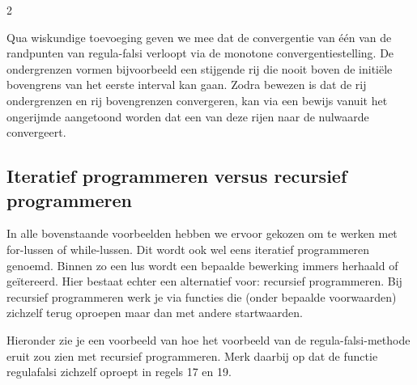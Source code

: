         \begin{multicols}{2}
        
        Qua wiskundige toevoeging geven we mee dat de convergentie van één van de randpunten van regula-falsi verloopt via de monotone convergentiestelling. De ondergrenzen vormen bijvoorbeeld een stijgende rij die nooit boven de initi\"ele bovengrens van het eerste interval kan gaan. Zodra bewezen is dat de rij ondergrenzen en rij bovengrenzen convergeren, kan via een bewijs vanuit het ongerijmde aangetoond worden dat een van deze rijen naar de nulwaarde convergeert.


    \subsection{Iteratief programmeren versus recursief programmeren}
    In alle bovenstaande voorbeelden hebben we ervoor gekozen om te werken met for-lussen of while-lussen. Dit wordt ook wel eens iteratief programmeren genoemd. Binnen zo een lus wordt een bepaalde bewerking immers herhaald of ge\"itereerd. Hier bestaat echter een alternatief voor: recursief programmeren. Bij recursief programmeren werk je via functies die (onder bepaalde voorwaarden) zichzelf terug oproepen maar dan met andere startwaarden. 
    
    Hieronder zie je een voorbeeld van hoe het voorbeeld van de regula-falsi-methode eruit zou zien met recursief programmeren. Merk daarbij op dat de functie regulafalsi zichzelf oproept in regels 17 en 19.
    \end{multicols}
            

